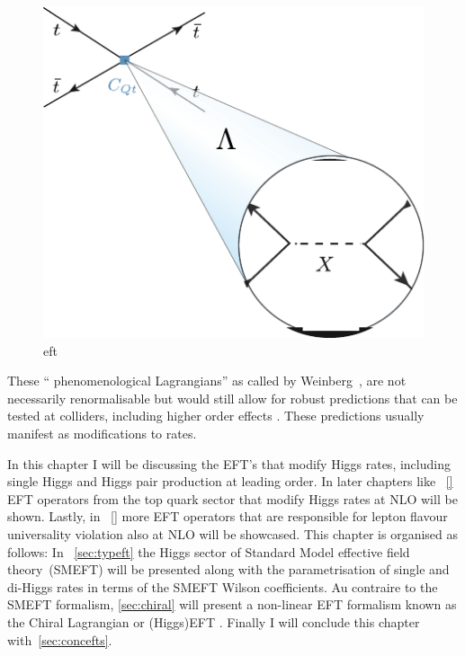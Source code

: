 \begin{figure}[h!]
	\begin{center}
		\includegraphics[width=.4 \linewidth]{figures/EFT}
		\caption{eft}
		\label{fig:eft}
	\end{center}
\end{figure}
These `` phenomenological Lagrangians'' as called by Weinberg~\cite{WEINBERG1979327}, are not necessarily renormalisable but would still allow for robust predictions that can be tested at colliders, including higher order effects . These predictions usually manifest as modifications to rates.
\par In this chapter I will be discussing the EFT's that modify Higgs rates, including single Higgs and Higgs pair production at leading order. In later chapters like ~\autoref{}  EFT operators from the top quark sector that modify Higgs rates at NLO will be shown. Lastly, in ~\autoref{} more EFT operators that are responsible for lepton flavour universality violation also at NLO will be showcased. This chapter  is organised as follows:  In ~\autoref{sec:typeft} the Higgs sector of Standard Model effective field theory~(SMEFT) will be presented along with the parametrisation of single and di-Higgs rates in terms of the SMEFT Wilson coefficients. Au contraire to the SMEFT formalism, \autoref{sec:chiral} will present a non-linear EFT formalism known as the Chiral Lagrangian or (Higgs)EFT . Finally I will conclude this chapter with~\autoref{sec:concefts}.
